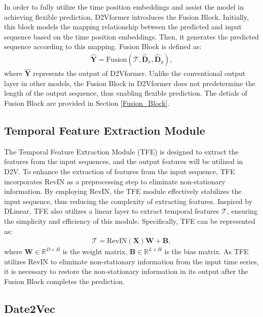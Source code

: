 \documentclass{article}
\begin{document}
In order to fully utilize the time position embeddings and assist the model in achieving flexible prediction, D2Vformer introduces the Fusion Block. Initially, this block models the mapping relationship between the predicted and input sequence based on the time position embeddings. Then, it generates the predicted sequence according to this mapping. Fusion Block is defined as:
\begin{eqnarray}
    \hat{\pmb{Y}} = \text{Fusion}(\boldsymbol{\mathcal{T}},\hat{\pmb{D}}_{x},\hat{\pmb{D}}_{y}),
\end{eqnarray}
where $\hat{\pmb{Y}}$ represents the output of D2Vformer. Unlike the conventional output layer in other models, the Fusion Block in D2Vformer does not predetermine the length of the output sequence, thus enabling flexible prediction. The detials of Fusion Block are provided in Section \ref{Fusion_Block}.

\subsection{Temporal Feature Extraction Module} \label{TFE}

The Temporal Feature Extraction Module (TFE) is designed to extract the features from the input sequences, and the output features will be utilized in D2V. To enhance the extraction of features from the input sequence, TFE incorporates RevIN\cite{revin} as a preprocessing step to eliminate non-stationary information.
By employing RevIN, the TFE module effectively stabilizes the input sequence, thus reducing the complexity of extracting features. 
Inspired by DLinear\cite{dlinear}, TFE also utilizes a linear layer to extract temporal features $\boldsymbol{\mathcal{T}}$, ensuring the simplicity and efficiency of this module.
Specifically, TFE can be represented as:
\begin{eqnarray}
    \boldsymbol{\mathcal{T}} = \text{RevIN}(\pmb{X})\pmb{W}  + \pmb{B},
\end{eqnarray}
where $\pmb{W} \in \mathbb{R}^{D \times H}$ is the weight matrix, $\pmb{B} \in \mathbb{R}^{L \times H}$ is the bias matrix. 
As TFE utilizes RevIN to eliminate non-stationary information from the input time series, it is necessary to restore the non-stationary information\cite{revin} in its output after the Fusion Block completes the prediction.


\subsection{Date2Vec} \label{Date2Vec_Tensor}
\end{document}

